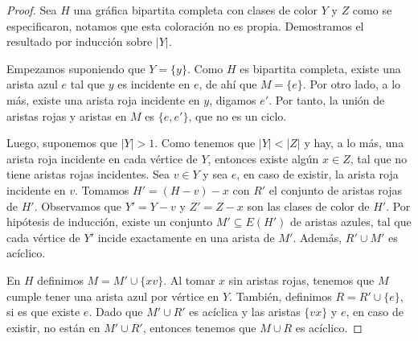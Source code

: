 \begin{proof}
    Sea $H$ una gr\'afica bipartita completa con clases de color $Y$ y $Z$ como
    se especificaron, notamos que esta coloraci\'on no es propia. Demostramos el
    resultado por inducci\'on sobre $|Y|$. 

    Empezamos suponiendo que $Y=\{y\}$. Como $H$ es bipartita completa, existe
    una arista azul $e$ tal que $y$ es incidente en $e$, de ah\'i que $M = \{ e
    \}$. Por otro lado, a lo m\'as, existe una arista roja incidente en $y$,
    digamos $e'$. Por tanto, la uni\'on de aristas rojas y aristas en $M$ es
    $\{e, e'\}$, que no es un ciclo.

    Luego, suponemos que $|Y|>1$. Como tenemos que $|Y|<|Z|$ y hay, a lo m\'as,
    una arista roja incidente en cada v\'ertice de $Y$, entonces existe alg\'un
    $x \in Z$, tal que no tiene aristas rojas incidentes. Sea $v \in Y$ y sea
    $e$, en caso de existir, la arista roja incidente en $v$. Tomamos $H'=
    (H-v)-x$ con $R'$ el conjunto de aristas rojas de $H'$. Observamos que $Y' =
    Y- v$ y $Z'= Z- x$ son las clases de color de $H'$. Por hip\'otesis de
    inducci\'on, existe un conjunto $M' \subseteq E(H')$ de aristas azules, tal
    que cada v\'ertice de $Y'$ incide exactamente en una arista de $M'$.
    Adem\'as, $R'\cup M'$ es ac\'iclico.
    
    En $H$ definimos $M = M'\cup \{xv\}$. Al tomar $x$ sin aristas rojas,
    tenemos que $M$ cumple tener una arista azul por v\'ertice en $Y$.
    Tambi\'en, definimos $R= R'\cup \{ e \}$, si es que existe $e$.  Dado que
    $M'\cup R'$ es ac\'iclica y las aristas $\{vx\}$ y $e$, en caso de existir,
    no est\'an en $M'\cup R'$, entonces tenemos que $M \cup R$ es ac\'iclico.
\end{proof}

